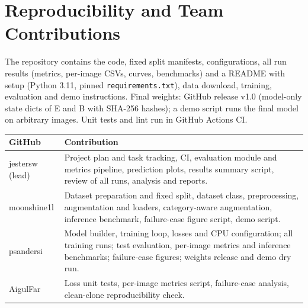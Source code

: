 \documentclass[10pt,a4paper]{article}
\begin{document}
\section{Reproducibility and Team Contributions}

The repository contains the code, fixed split manifests, configurations, all run results (metrics, per-image CSVs, curves, benchmarks) and a README with setup (Python 3.11, pinned \texttt{requirements.txt}), data download, training, evaluation and demo instructions. Final weights: GitHub release v1.0 (model-only state dicts of E and B with SHA-256 hashes); a demo script runs the final model on arbitrary images. Unit tests and lint run in GitHub Actions CI.

\begin{table}[H]
\centering
\small
\begin{tabularx}{\linewidth}{lX}
\toprule
GitHub & Contribution \\
\midrule
jestersw (lead) & Project plan and task tracking, CI, evaluation module and metrics pipeline, prediction plots, results summary script, review of all runs, analysis and reports. \\
moonshine1l & Dataset preparation and fixed split, dataset class, preprocessing, augmentation and loaders, category-aware augmentation, inference benchmark, failure-case figure script, demo script. \\
psandersi & Model builder, training loop, losses and CPU configuration; all training runs; test evaluation, per-image metrics and inference benchmarks; failure-case figures; weights release and demo dry run. \\
AigulFar & Loss unit tests, per-image metrics script, failure-case analysis, clean-clone reproducibility check. \\
\bottomrule
\end{tabularx}
\end{table}
\end{document}
